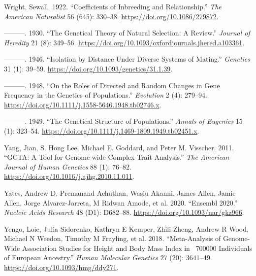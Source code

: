 \documentclass[
]{book}
\newlength{\cslhangindent}
\newlength{\cslentryspacingunit} %
\newenvironment{CSLReferences}[2] %
 {%
  \setlength{\parindent}{0pt}
  \ifodd #1
  \let\oldpar\par
  \def\par{\hangindent=\cslhangindent\oldpar}
  \fi
  \setlength{\parskip}{#2\cslentryspacingunit}
 }%
 {}
\begin{document}
\begin{CSLReferences}{1}{0}
\leavevmode{}%
Wright, Sewall. 1922. {``Coefficients of {Inbreeding} and {Relationship}.''} \emph{The American Naturalist} 56 (645): 330--38. \url{https://doi.org/10.1086/279872}.

\leavevmode{}%
---------. 1930. {``The {Genetical Theory} of {Natural Selection}: {A Review}.''} \emph{Journal of Heredity} 21 (8): 349--56. \url{https://doi.org/10.1093/oxfordjournals.jhered.a103361}.

\leavevmode{}%
---------. 1946. {``Isolation by {Distance} Under {Diverse Systems} of {Mating}.''} \emph{Genetics} 31 (1): 39--59. \url{https://doi.org/10.1093/genetics/31.1.39}.

\leavevmode{}%
---------. 1948. {``On the {Roles} of {Directed} and {Random Changes} in {Gene Frequency} in the {Genetics} of {Populations}.''} \emph{Evolution} 2 (4): 279--94. \url{https://doi.org/10.1111/j.1558-5646.1948.tb02746.x}.

\leavevmode{}%
---------. 1949. {``The {Genetical Structure} of {Populations}.''} \emph{Annals of Eugenics} 15 (1): 323--54. \url{https://doi.org/10.1111/j.1469-1809.1949.tb02451.x}.

\leavevmode{}%
Yang, Jian, S. Hong Lee, Michael E. Goddard, and Peter M. Visscher. 2011. {``{GCTA}: {A Tool} for {Genome-wide Complex Trait Analysis}.''} \emph{The American Journal of Human Genetics} 88 (1): 76--82. \url{https://doi.org/10.1016/j.ajhg.2010.11.011}.

\leavevmode{}%
Yates, Andrew D, Premanand Achuthan, Wasiu Akanni, James Allen, Jamie Allen, Jorge Alvarez-Jarreta, M Ridwan Amode, et al. 2020. {``Ensembl 2020.''} \emph{Nucleic Acids Research} 48 (D1): D682--88. \url{https://doi.org/10.1093/nar/gkz966}.

\leavevmode{}%
Yengo, Loic, Julia Sidorenko, Kathryn E Kemper, Zhili Zheng, Andrew R Wood, Michael N Weedon, Timothy M Frayling, et al. 2018. {``Meta-Analysis of Genome-Wide Association Studies for Height and Body Mass Index in ~700000 Individuals of {European} Ancestry.''} \emph{Human Molecular Genetics} 27 (20): 3641--49. \url{https://doi.org/10.1093/hmg/ddy271}.


\end{CSLReferences}
\end{document}
